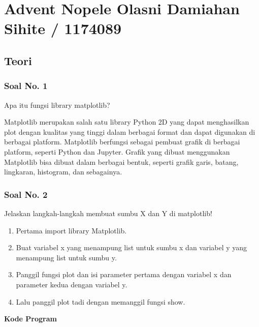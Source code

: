 \section{Advent Nopele Olasni Damiahan Sihite / 1174089}
\subsection{Teori}
\subsubsection{Soal No. 1}
\hfill \break
Apa itu fungsi library matplotlib?

\hfill \break
Matplotlib merupakan salah satu library Python 2D yang dapat menghasilkan plot dengan kualitas yang tinggi dalam berbagai format dan dapat digunakan di berbagai platform. Matplotlib berfungsi sebagai pembuat grafik di berbagai platform, seperti Python dan Jupyter. Grafik yang dibuat menggunakan Matplotlib bisa dibuat dalam berbagai bentuk, seperti grafik garis, batang, lingkaran, histogram, dan sebagainya.

\subsubsection{Soal No. 2}
\hfill \break
Jelaskan langkah-langkah membuat sumbu X dan Y di matplotlib!

\begin{enumerate}
	\item Pertama import library Matplotlib.	
	
	
	\item Buat variabel x yang menampung list untuk sumbu x dan variabel y yang menampung list untuk sumbu y.	
	
	
	\item Panggil fungsi plot dan isi parameter pertama dengan variabel x dan parameter kedua dengan variabel y.
		

	\item Lalu panggil plot tadi dengan memanggil fungsi show.
	
	
\end{enumerate}
\hfill \break
\textbf{Kode Program}



